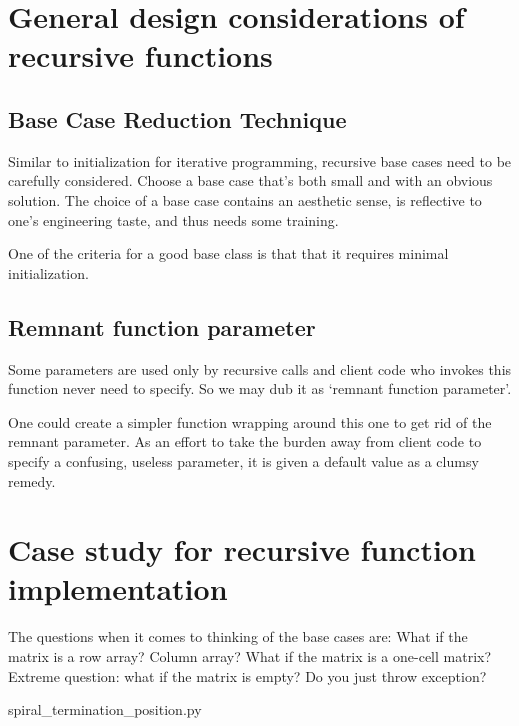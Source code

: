 \section{General design considerations of recursive functions}\label{sec:generalRecursiveFunction}

\subsection{Base Case Reduction Technique}\label{subsec:baseCaseShrinkingTechnique}

Similar to initialization for iterative programming, recursive base cases need to be carefully
considered.
Choose a base case that's both small and with an obvious solution.
The choice of a base case contains an aesthetic sense, is reflective to one's
engineering taste, and thus needs some training.

One of the criteria for a good base class is that that it requires minimal initialization.

\subsection{Remnant function parameter}\label{sec:remnantFunctionParameter}

Some parameters are used only by recursive calls and
client code who invokes this function never need to specify.
So we may dub it as `remnant function parameter'.

One could create a simpler function wrapping around this one to get rid of the remnant
parameter.
As an effort to take the burden away from client code to specify a confusing, useless parameter,
it is given a default value as a clumsy remedy.

\section{Case study for recursive function implementation}\label{sec:recursivecaseStudy}

The questions when it comes to thinking of the base cases are:
What if the matrix is a row array?
Column array?
What if the matrix is a one-cell matrix?
Extreme question: what if the matrix is empty?
Do you just throw exception?

\begin{clisting}
    
    {spiral_termination_position.py}
\end{clisting}

